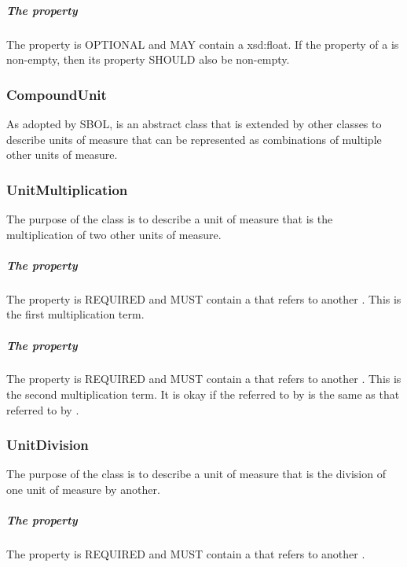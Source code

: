 \subparagraph{The  property}\label{sec:hasFactor:SingularUnit}
The  property is OPTIONAL and MAY contain a xsd:float. If the  property of a  is non-empty, then its  property SHOULD also be non-empty.

\subsubsection{CompoundUnit}
\label{sec:CompoundUnit}

As adopted by SBOL,  is an abstract class that is extended by other classes to describe units of measure that can be represented as combinations of multiple other units of measure.

\subsubsection{UnitMultiplication}
\label{sec:UnitMultiplication}

The purpose of the  class is to describe a unit of measure that is the multiplication of two other units of measure. 

\subparagraph{The  property}\label{sec:hasTerm1}
The  property is REQUIRED and MUST contain a  that refers to another . This  is the first multiplication term.

\subparagraph{The  property}\label{sec:hasTerm2}
The  property is REQUIRED and MUST contain a  that refers to another . This  is the second multiplication term. It is okay if the  referred to by  is the same as that referred to by .

\subsubsection{UnitDivision}
\label{sec:UnitDivision}

The purpose of the  class is to describe a unit of measure that is the division of one unit of measure by another.

\subparagraph{The  property}\label{sec:hasNumerator}
The  property is REQUIRED and MUST contain a  that refers to another .

